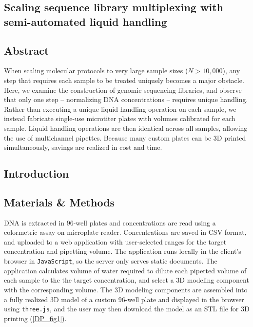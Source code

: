 \begin{refsection}

\chapter{Scaling sequence library multiplexing with semi-automated liquid handling}


\section{Abstract}

When scaling molecular protocols to very large sample sizes ($N > 10,000$), any step that requires each sample to be treated uniquely becomes a major obstacle. Here, we examine the construction of genomic sequencing libraries, and observe that only one step -- normalizing DNA concentrations -- requires unique handling. Rather than executing a unique liquid handling operation on each sample, we instead fabricate single-use microtiter plates with volumes calibrated for each sample. Liquid handling operations are then identical across all samples, allowing the use of multichannel pipettes. Because many custom plates can be 3D printed simultaneously, savings are realized in cost and time.

\section{Introduction}



\section{Materials \& Methods}

DNA is extracted in 96-well plates and concentrations are read using a colormetric assay on microplate reader. Concentrations are saved in CSV format, and uploaded to a web application with user-selected ranges for the target concentration and pipetting volume. The application runs locally in the client's browser in {\tt JavaScript}, so the server only serves static documents. The application calculates volume of water required to dilute each pipetted volume of each sample to the the target concentration, and select a 3D modeling component with the corresponding volume. The 3D modeling components are assembled into a fully realized 3D model of a custom 96-well plate and displayed in the browser using {\tt three.js}, and the user may then download the model as an STL file for 3D printing (\ref{DP_fig1}). 


\end{refsection}
